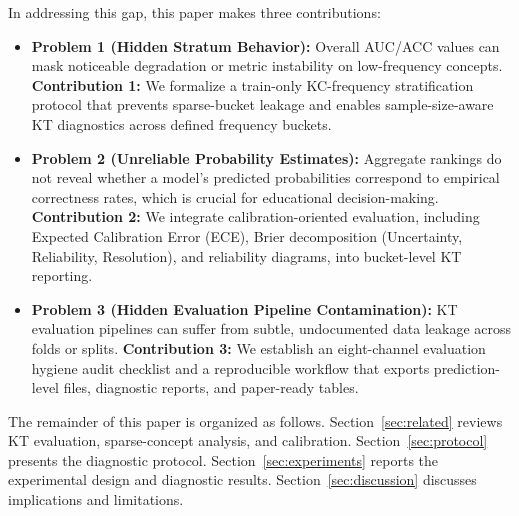 In addressing this gap, this paper makes three contributions:
\begin{itemize}
    \item \textbf{Problem 1 (Hidden Stratum Behavior):} Overall AUC/ACC values can mask noticeable degradation or metric instability on low-frequency concepts. 
    \textbf{Contribution 1:} We formalize a train-only KC-frequency stratification protocol that prevents sparse-bucket leakage and enables sample-size-aware KT diagnostics across defined frequency buckets.
    \item \textbf{Problem 2 (Unreliable Probability Estimates):} Aggregate rankings do not reveal whether a model's predicted probabilities correspond to empirical correctness rates, which is crucial for educational decision-making. 
    \textbf{Contribution 2:} We integrate calibration-oriented evaluation, including Expected Calibration Error (ECE), Brier decomposition (Uncertainty, Reliability, Resolution), and reliability diagrams, into bucket-level KT reporting.
    \item \textbf{Problem 3 (Hidden Evaluation Pipeline Contamination):} KT evaluation pipelines can suffer from subtle, undocumented data leakage across folds or splits. 
    \textbf{Contribution 3:} We establish an eight-channel evaluation hygiene audit checklist and a reproducible workflow that exports prediction-level files, diagnostic reports, and paper-ready tables.
\end{itemize}

The remainder of this paper is organized as follows. Section~\ref{sec:related} reviews KT evaluation, sparse-concept analysis, and calibration. Section~\ref{sec:protocol} presents the diagnostic protocol. Section~\ref{sec:experiments} reports the experimental design and diagnostic results. Section~\ref{sec:discussion} discusses implications and limitations.
